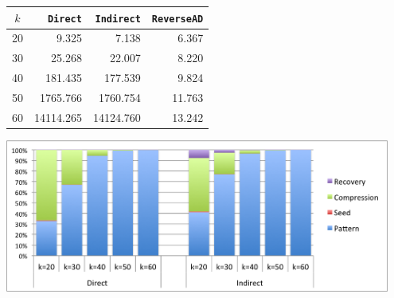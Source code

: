 \documentclass[10pt, a4paper, english]{article}
\begin{document}
\begin{minipage}{\textwidth}
  \begin{minipage}[b]{0.45\textwidth}
    \centering
\begin{tabular}{|c|r|r|r|}
\hline
$k$ & {\tt Direct} & {\tt Indirect} & {\tt ReverseAD} \\
\hline
20 & 9.325 & 7.138 & 6.367 \\
30 & 25.268 & 22.007 & 8.220\\
40 & 181.435 & 177.539 & 9.824\\
50 & 1765.766 & 1760.754 & 11.763 \\
60 & 14114.265 & 14124.760 & 13.242\\
\hline
\end{tabular}
\end{minipage}
\begin{minipage}[b]{0.06\textwidth}
\phantom{b}
\end{minipage}
  \begin{minipage}[b]{0.45\textwidth}
    \centering
    \includegraphics[width=0.95\textwidth]{figures/pb}
  \end{minipage}
  \hfill
\end{minipage}
\end{document}
